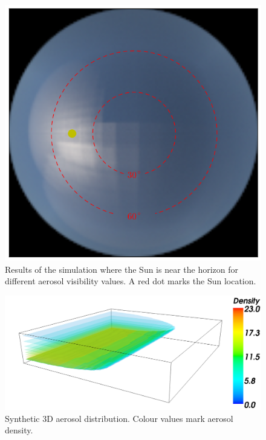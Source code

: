 \documentclass[10pt,twocolumn,letterpaper]{article}
\begin{document}
\begin{figure}
 \includegraphics[width=\columnwidth]{images/ref_img37.png}
  \caption{Results of the simulation where the Sun is near the horizon
    for different aerosol visibility values. A red dot marks the Sun
    location.}
  \label{fig:simulation-results2}
\end{figure}


\begin{figure}
  \centering
    \includegraphics[width=\columnwidth]{images/orig2}
  \caption{Synthetic 3D aerosol distribution. Colour values mark
    aerosol density.}
  \label{fig:synth-atmo}
\end{figure}
\end{document}
